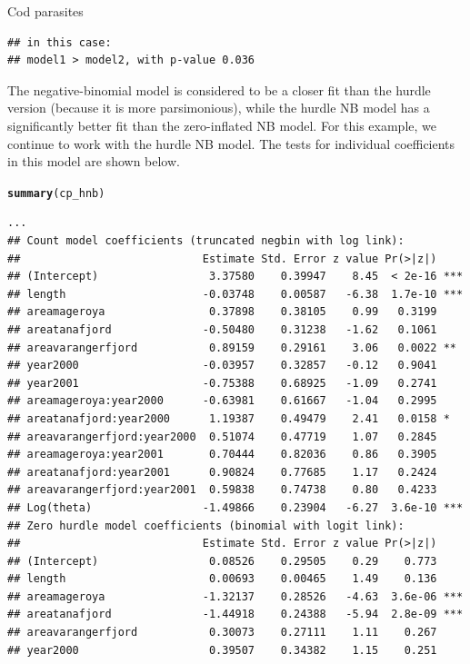 \documentclass[11pt]{book}\usepackage[]{graphicx}\usepackage[]{color}
\makeatletter
\newcommand{\hlstd}[1]{\textcolor[rgb]{0.345,0.345,0.345}{#1}}%
\newcommand{\hlkwd}[1]{\textcolor[rgb]{0.737,0.353,0.396}{\textbf{#1}}}%
\newenvironment{kframe}{%
 \def\at@end@of@kframe{}%
 \ifinner\ifhmode%
  \def\at@end@of@kframe{\end{minipage}}%
  \begin{minipage}{\columnwidth}%
 \fi\fi%
 \def\FrameCommand##1{\hskip\@totalleftmargin \hskip-\fboxsep
 \colorbox{shadecolor}{##1}\hskip-\fboxsep
     \hskip-\linewidth \hskip-\@totalleftmargin \hskip\columnwidth}%
 \MakeFramed {\advance\hsize-\width
   \@totalleftmargin\z@ \linewidth\hsize
   \@setminipage}}%
 {\par\unskip\endMakeFramed%
 \at@end@of@kframe}
\newenvironment{knitrout}{}{} %
\renewenvironment{knitrout}{\small\renewcommand{\baselinestretch}{.85}}{} %
\makeatother
\begin{document}
\begin{Example}[cod2]{Cod parasites}
\begin{knitrout}
\begin{kframe}
\begin{verbatim}
## in this case:
## model1 > model2, with p-value 0.036
\end{verbatim}
\end{kframe}
\end{knitrout}
The negative-binomial model is considered to be a closer fit
than the hurdle version (because it is more parsimonious),
while the hurdle NB model has a significantly better fit than the zero-inflated
NB model.  For this example, we continue to work with the hurdle NB model.
The tests for individual coefficients in this model are shown below.
\begin{knitrout}\footnotesize
{}\color{fgcolor}\begin{kframe}
\begin{alltt}
\hlkwd{summary}\hlstd{(cp_hnb)}
\end{alltt}
\begin{verbatim}
...
## Count model coefficients (truncated negbin with log link):
##                            Estimate Std. Error z value Pr(>|z|)    
## (Intercept)                 3.37580    0.39947    8.45  < 2e-16 ***
## length                     -0.03748    0.00587   -6.38  1.7e-10 ***
## areamageroya                0.37898    0.38105    0.99   0.3199    
## areatanafjord              -0.50480    0.31238   -1.62   0.1061    
## areavarangerfjord           0.89159    0.29161    3.06   0.0022 ** 
## year2000                   -0.03957    0.32857   -0.12   0.9041    
## year2001                   -0.75388    0.68925   -1.09   0.2741    
## areamageroya:year2000      -0.63981    0.61667   -1.04   0.2995    
## areatanafjord:year2000      1.19387    0.49479    2.41   0.0158 *  
## areavarangerfjord:year2000  0.51074    0.47719    1.07   0.2845    
## areamageroya:year2001       0.70444    0.82036    0.86   0.3905    
## areatanafjord:year2001      0.90824    0.77685    1.17   0.2424    
## areavarangerfjord:year2001  0.59838    0.74738    0.80   0.4233    
## Log(theta)                 -1.49866    0.23904   -6.27  3.6e-10 ***
## Zero hurdle model coefficients (binomial with logit link):
##                            Estimate Std. Error z value Pr(>|z|)    
## (Intercept)                 0.08526    0.29505    0.29    0.773    
## length                      0.00693    0.00465    1.49    0.136    
## areamageroya               -1.32137    0.28526   -4.63  3.6e-06 ***
## areatanafjord              -1.44918    0.24388   -5.94  2.8e-09 ***
## areavarangerfjord           0.30073    0.27111    1.11    0.267    
## year2000                    0.39507    0.34382    1.15    0.251    

\end{verbatim}
\end{kframe}
\end{knitrout}
\end{Example}
\end{document}
